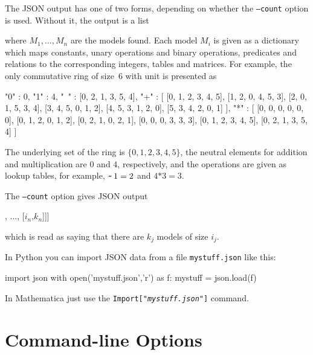 \documentclass{article}
\begin{document}
The JSON output has one of two forms, depending on whether the
\texttt{--count} option is used. Without it, the output is a list
%
\begin{source}
\end{source}
%
where $M_1, \ldots, M_n$ are the models found. Each model $M_i$ is
given as a dictionary which maps constants, unary operations and
binary operations, predicates and relations to the corresponding
integers, tables and matrices. For example, the only commutative ring
of size~$6$ with unit is presented as
%
\begin{shell}
{
  "0" : 0,
  "1" : 4,
  "~" : [0, 2, 1, 3, 5, 4], 
  "+" :
    [
      [0, 1, 2, 3, 4, 5], 
      [1, 2, 0, 4, 5, 3], 
      [2, 0, 1, 5, 3, 4], 
      [3, 4, 5, 0, 1, 2], 
      [4, 5, 3, 1, 2, 0], 
      [5, 3, 4, 2, 0, 1]
    ], 
  "*" :
    [
      [0, 0, 0, 0, 0, 0], 
      [0, 1, 2, 0, 1, 2], 
      [0, 2, 1, 0, 2, 1], 
      [0, 0, 0, 3, 3, 3], 
      [0, 1, 2, 3, 4, 5], 
      [0, 2, 1, 3, 5, 4]
    ]
}
\end{shell}
%
The underlying set of the ring is $\{0,1,2,3,4,5\}$, the neutral
elements for addition and multiplication are $0$ and $4$,
respectively, and the operations are given as lookup tables, for
example, $\mathop{\texttt{\char126}} 1 = 2$ and $4
\mathbin{\texttt{*}} 3 = 3$.

The \texttt{--count} option gives JSON output
%
\begin{source}
["/@theory_name@/", [[$i_1$,$k_1$], ..., [$i_n$,$k_n$]]]
\end{source}
%
which is read as saying that there are $k_j$ models of size $i_j$.

In Python you can import JSON data from a file
\texttt{mystuff.json} like this:
%
\begin{source}
import json
with open('mystuff.json','r') as f:
    mystuff = json.load(f)
\end{source}

In Mathematica just use the \texttt{Import["\textit{mystuff.json}"]}
command.

\section{Command-line Options}
\label{sec:command-line-options}
\end{document}
